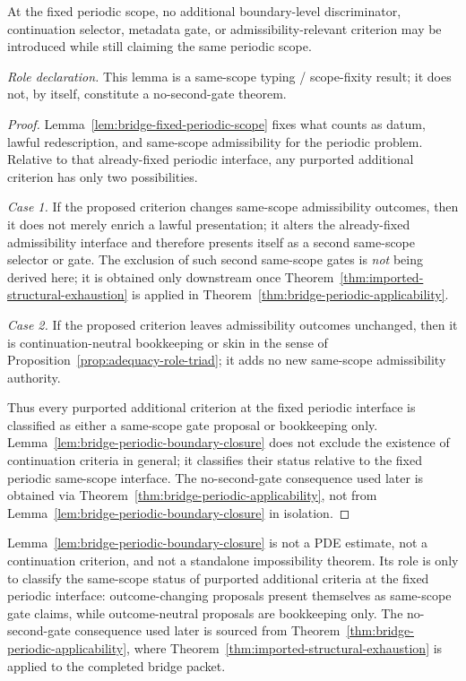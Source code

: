\begin{manuallemma}
\label{lem:bridge-periodic-boundary-closure}
At the fixed periodic scope, no additional boundary-level discriminator, continuation selector, metadata gate, or admissibility-relevant criterion may be introduced while still claiming the same periodic scope.

\smallskip
\noindent\emph{Role declaration.} This lemma is a same-scope typing / scope-fixity result; it does not, by itself, constitute a no-second-gate theorem.
\end{manuallemma}

\begin{proof}
Lemma~\ref{lem:bridge-fixed-periodic-scope} fixes what counts as datum, lawful redescription, and same-scope admissibility for the periodic problem. Relative to that already-fixed periodic interface, any purported additional criterion has only two possibilities.

\noindent\emph{Case 1.} If the proposed criterion changes same-scope admissibility outcomes, then it does not merely enrich a lawful presentation; it alters the already-fixed admissibility interface and therefore presents itself as a second same-scope selector or gate. The exclusion of such second same-scope gates is \emph{not} being derived here; it is obtained only downstream once Theorem~\ref{thm:imported-structural-exhaustion} is applied in Theorem~\ref{thm:bridge-periodic-applicability}.

\noindent\emph{Case 2.} If the proposed criterion leaves admissibility outcomes unchanged, then it is continuation-neutral bookkeeping or skin in the sense of Proposition~\ref{prop:adequacy-role-triad}; it adds no new same-scope admissibility authority.

Thus every purported additional criterion at the fixed periodic interface is classified as either a same-scope gate proposal or bookkeeping only. Lemma~\ref{lem:bridge-periodic-boundary-closure} does not exclude the existence of continuation criteria in general; it classifies their status relative to the fixed periodic same-scope interface. The no-second-gate consequence used later is obtained via Theorem~\ref{thm:bridge-periodic-applicability}, not from Lemma~\ref{lem:bridge-periodic-boundary-closure} in isolation.
\end{proof}

\begin{tcolorbox}[title={What 12F is not}, colback=blue!2!white, colframe=blue!55!black]
Lemma~\ref{lem:bridge-periodic-boundary-closure} is not a PDE estimate, not a continuation criterion, and not a standalone impossibility theorem. Its role is only to classify the same-scope status of purported additional criteria at the fixed periodic interface: outcome-changing proposals present themselves as same-scope gate claims, while outcome-neutral proposals are bookkeeping only. The no-second-gate consequence used later is sourced from Theorem~\ref{thm:bridge-periodic-applicability}, where Theorem~\ref{thm:imported-structural-exhaustion} is applied to the completed bridge packet.
\end{tcolorbox}

